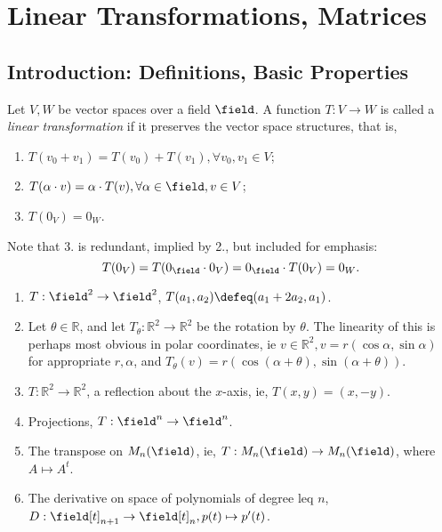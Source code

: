 \section{Linear Transformations, Matrices}
\subsection{Introduction: Definitions, Basic Properties}
\begin{definition}
    Let $V, W$ be vector spaces over a field $\field$. A function $T: V \to W$ is called a \emph{linear transformation} if it preserves the vector space structures, that is, \begin{enumerate}
        \item $T(v_0 + v_1) = T(v_0) + T(v_1), \forall v_0, v_1 \in V$;
        \item $T(\alpha \cdot v) = \alpha \cdot T(v), \forall \alpha \in \field, v \in V$;
        \item $T(0_V) = 0_W$.
    \end{enumerate}
\end{definition}

\begin{remark}
    Note that 3. is redundant, implied by 2., but included for emphasis:
    \[
    T(0_V) = T(0_\field \cdot 0_V) = 0_\field \cdot T(0_V) = 0_W.    
    \]
\end{remark}

\begin{example}
    \begin{enumerate}
        \item $T: \field^2 \to \field^2$, $T(a_1, a_2) \defeq (a_1 + 2 a_2, a_1)$.
        \item Let $\theta \in \mathbb{R}$, and let $T_\theta : \mathbb{R}^2 \to \mathbb{R}^2$ be the rotation by $\theta$. The linearity of this is perhaps most obvious in polar coordinates, ie $v \in \mathbb{R}^2, v = r (\cos \alpha, \sin \alpha)$ for appropriate $r, \alpha$, and $T_\theta(v) = r (\cos (\alpha + \theta), \sin (\alpha + \theta))$.
        \item $T: \mathbb{R}^2 \to \mathbb{R}^2$, a reflection about the $x$-axis, ie, $T(x, y) = (x, -y)$.
        \item Projections, $T : \field^n \to \field^n$.
        \item The transpose on $M_n(\field)$, ie, $T: M_n(\field) \to M_n (\field)$, where $A \mapsto A^t$.
        \item The derivative on space of polynomials of degree leq $n$, $D : \field[t]_{n+1} \to \field[t]_{n}, p(t) \mapsto p'(t)$.
    \end{enumerate}
\end{example}


